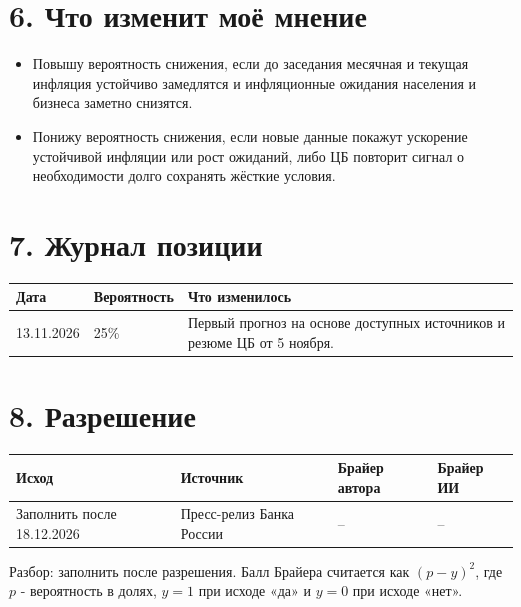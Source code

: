 \documentclass[10pt,a4paper]{article}
\begin{document}
\section*{6. Что изменит моё мнение}
\begin{itemize}
\setlength{\itemsep}{1pt}
\item Повышу вероятность снижения, если до заседания месячная и текущая инфляция устойчиво замедлятся и инфляционные ожидания населения и бизнеса заметно снизятся.
\item Понижу вероятность снижения, если новые данные покажут ускорение устойчивой инфляции или рост ожиданий, либо ЦБ повторит сигнал о необходимости долго сохранять жёсткие условия.
\end{itemize}

\section*{7. Журнал позиции}
\begin{tabular}{|p{2.8cm}|p{2.8cm}|p{10.5cm}|}\hline
Дата & Вероятность & Что изменилось \\ \hline
13.11.2026 & 25\% & Первый прогноз на основе доступных источников и резюме ЦБ от 5 ноября. \\ \hline
\end{tabular}

\section*{8. Разрешение}
\begin{tabular}{|p{3.8cm}|p{5.8cm}|p{2.8cm}|p{2.8cm}|}\hline
Исход & Источник & Брайер автора & Брайер ИИ \\ \hline
Заполнить после 18.12.2026 & Пресс-релиз Банка России & -- & -- \\ \hline
\end{tabular}

Разбор: заполнить после разрешения. Балл Брайера считается как $(p-y)^2$, где $p$ - вероятность в долях, $y=1$ при исходе «да» и $y=0$ при исходе «нет».
\end{document}
